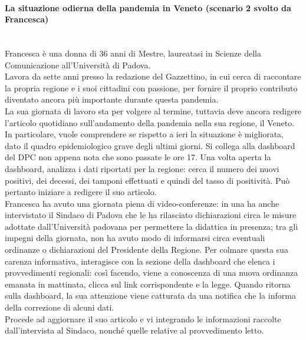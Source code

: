 \paragraph{La situazione odierna della pandemia in Veneto (scenario 2 svolto da Francesca)}\mbox{}\\
Francesca è una donna di 36 anni di Mestre, laureatasi in Scienze della Comunicazione all'Università di Padova.\\
Lavora da sette anni presso la redazione del Gazzettino, in cui cerca di raccontare la propria regione e i suoi cittadini con passione, per fornire il proprio contributo diventato ancora più importante durante questa pandemia.\\
La sua giornata di lavoro sta per volgere al termine, tuttavia deve ancora redigere l'articolo quotidiano sull'andamento della pandemia nella sua regione, il Veneto.\\
In particolare, vuole comprendere se rispetto a ieri la situazione è migliorata, dato il quadro epidemiologico grave degli ultimi giorni. Si collega alla dashboard del DPC non appena nota che sono passate le ore 17.
Una volta aperta la dashboard, analizza i dati riportati per la regione: cerca il numero dei nuovi positivi, dei decessi, dei tamponi effettuati e quindi del tasso di positività. Può pertanto iniziare a redigere il suo articolo.\\
Francesca ha avuto una giornata piena di video-conferenze: in una ha anche intervistato il Sindaco di Padova che le ha rilasciato dichiarazioni circa le misure adottate dall'Università padovana per permettere la didattica in presenza; tra gli impegni della giornata, non ha avuto modo di informarsi circa eventuali ordinanze o dichiarazioni del Presidente della Regione.
Per colmare questa sua carenza informativa, interagisce con la sezione della dashboard che elenca i provvedimenti regionali: così facendo, viene a conoscenza di una nuova ordinanza emanata in mattinata, clicca sul link corrispondente e la legge. Quando ritorna sulla dashboard, la sua attenzione viene catturata da una notifica che la informa della correzione di alcuni dati.\\
Procede ad aggiornare il suo articolo e vi integrando le informazioni raccolte dall'intervista al Sindaco, nonché quelle relative al provvedimento letto.
\noindent
